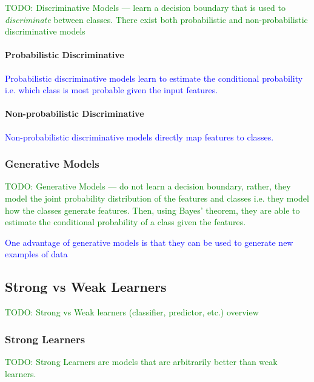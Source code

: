 \textcolor{green}{TODO: Discriminative Models --- learn a decision boundary that is used to \textit{discriminate} between classes. There exist both probabilistic and non-probabilistic discriminative models}

\paragraph{Probabilistic Discriminative}

\textcolor{blue}{Probabilistic discriminative models learn to estimate the conditional probability i.e. which class is most probable given the input features.}

\paragraph{Non-probabilistic Discriminative}

\textcolor{blue}{Non-probabilistic discriminative models directly map features to classes.}

\subsubsection{Generative Models}

\textcolor{green}{TODO: Generative Models --- do not learn a decision boundary, rather, they model the joint probability distribution of the features and classes i.e. they model how the classes generate features. Then, using Bayes' theorem, they are able to estimate the conditional probability of a class given the features.}


\textcolor{blue}{One advantage of generative models is that they can be used to generate new examples of data}

\subsection{Strong vs Weak Learners}

\textcolor{green}{TODO: Strong vs Weak learners (classifier, predictor, etc.) overview}

\subsubsection{Strong Learners}

\textcolor{green}{TODO: Strong Learners are models that are arbitrarily better than weak learners.}

